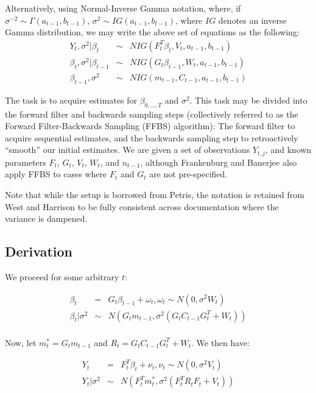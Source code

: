 \documentclass[
]{book}
\theoremstyle{definition}
\theoremstyle{definition}
\theoremstyle{definition}
\theoremstyle{definition}
\theoremstyle{remark}
\begin{document}
Alternatively, using Normal-Inverse Gamma notation, where, if \(\sigma^{-2} \sim \Gamma(a_{t-1},b_{t-1})\), \(\sigma^{2} \sim IG(a_{t-1},b_{t-1})\), where \(IG\) denotes an inverse Gamma distribution, we may write the above set of equations as the following:
\begin{eqnarray*}
Y_{t},\sigma^{2}\vert \beta_{t} &\sim& NIG(F_{t}^{T}\beta_{t}, V_{t}, a_{t-1}, b_{t-1})\\
\beta_{t},\sigma^{2}\vert \beta_{t-1} &\sim& NIG(G_{t}\beta_{t-1}, W_{t}, a_{t-1}, b_{t-1})\\
\beta_{t-1},\sigma^{2} &\sim& NIG(m_{t-1}, C_{t-1}, a_{t-1}, b_{t-1})
\end{eqnarray*}

The task is to acquire estimates for \(\beta_{0,\ldots,T}\) and \(\sigma^{2}\). This task may be divided into the forward filter and backwards sampling steps (collectively referred to as the Forward Filter-Backwards Sampling (FFBS) algorithm): The forward filter to acquire sequential estimates, and the backwards sampling step to retroactively ``smooth'' our initial estimates. We are given a set of observations \(Y_{t,j}\), and known parameters \(F_{t}\), \(G_{t}\), \(V_{t}\), \(W_{t}\), and \(n_{t-1}\), although Frankenburg and Banerjee also apply FFBS to cases where \(F_{t}\) and \(G_{t}\) are not pre-specified.

Note that while the setup is borrowed from Petris, the notation is retained from West and Harrison to be fully consistent across documentation where the variance is dampened.

\hypertarget{derivation}{%
\subsection{Derivation}\label{derivation}}

We proceed for some arbitrary \(t\):

\begin{eqnarray*}
\beta_{t} &=& G_{t}\beta_{t-1} + \omega_{t}, \omega_{t} \sim N(0, \sigma^{2}W_{t})\\
\beta_{t}\vert \sigma^{2} &\sim& N(G_{t}m_{t-1}, \sigma^{2}(G_{t}C_{t-1}G_{t}^{T} + W_{t}))\\
\end{eqnarray*}

Now, let \(m^{*}_{t} = G_{t}m_{t-1}\) and \(R_{t} = G_{t}C_{t-1}G_{t}^{T} + W_{t}\). We then have:

\begin{eqnarray*}
Y_{t} &=& F_{t}^{T}\beta_{t} + \nu_{t}, \nu_{t}\sim N(0, \sigma^{2}V_{t})\\
Y_{t}\vert \sigma^{2} &\sim& N(F_{t}^{T}m^{*}_{t}, \sigma^{2}(F_{t}^{T}R_{t}F_{t} + V_{t}))
\end{eqnarray*}
\end{document}
